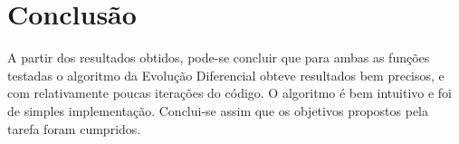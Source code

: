 \documentclass[12pt]{elsarticle}
\begin{document}
	\pagebreak
	\section{Conclusão}
	A partir dos resultados obtidos, pode-se concluir que para ambas as funções testadas o algoritmo da Evolução Diferencial obteve resultados bem precisos, e com relativamente poucas iterações do código. O algoritmo é bem intuitivo e foi de simples implementação. Conclui-se assim que os objetivos propostos pela tarefa foram cumpridos.
	
\end{document}
